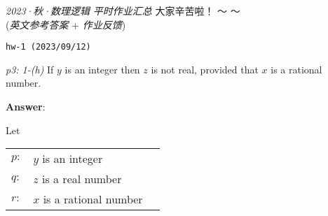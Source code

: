 \documentclass[UTF8,12pt,a4paper]{ctexart}
\begin{document}

\begin{center}
	\textit{2023·秋·数理逻辑} \qquad \textit{平时作业汇总}  \qquad 大家辛苦啦！  \faCoffee ～ ～\\
	(\textit{英文参考答案} + \textit{作业反馈})
\end{center}


\noindent\texttt{hw-1 (2023/09/12) }

\emph{p3: 1-(h)} \quad
If $y$ is an integer then $z$ is not real, provided that $x$ is a rational number.


\noindent\textbf{Answer}:

Let
\begin{center}
	\begin{tabular}{l l l }
 $p:$ & $y$ is an integer  \\
 $q:$ & $z$ is a real number  \\
 $r:$ & $x$ is a rational number 
\end{tabular}
\end{center}
\end{document}
